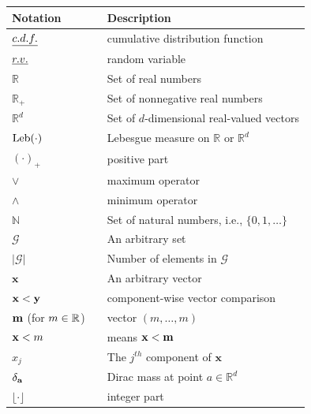 \begin{table}[!ht]
\begin{center}
\begin{footnotesize}
\begin{tabular}{lp{1cm}l}
\toprule
\textbf{Notation} && \textbf{Description}\\
\midrule
$\emph{c.d.f.}{}$ && cumulative distribution function\\
$\emph{r.v.}{}$ && random variable\\
$\mathbb{R}$ && Set of real numbers\\
$\mathbb{R}_+$ && Set of nonnegative real numbers\\
$\mathbb{R}^d$ && Set of $d$-dimensional real-valued vectors\\
$\text{Leb}(\cdot)$ && Lebesgue measure on $\mathbb{R}$ or $\mathbb{R}^d$\\
$(\cdot)_+$ && positive part\\
$\vee$ && maximum operator\\
$\wedge$ && minimum operator\\
$\mathbb{N}$ && Set of natural numbers, i.e., $\{0,1,\dots\}$\\
$\mathcal{G}$ && An arbitrary set\\
$|\mathcal{G}|$ && Number of elements in $\mathcal{G}$\\
$\mathbf{x}$ && An arbitrary vector\\
$\mathbf x < \mathbf y$ && component-wise vector comparison\\
$\mathbf m$ (for $m \in \mathbb{R}$) && vector $(m,\ldots,m)$\\
$\mathbf x < m$ && means $\mathbf x < \mathbf m$\\
$x_j$ && The $j^{th}$ component of $\mathbf{x}$\\
$\delta_{\mathbf a}$ && Dirac mass at point $a \in \mathbb{R}^d$\\
$\lfloor \cdot \rfloor$ && integer part\\

\end{tabular}
\end{footnotesize}
\end{center}
\end{table}
